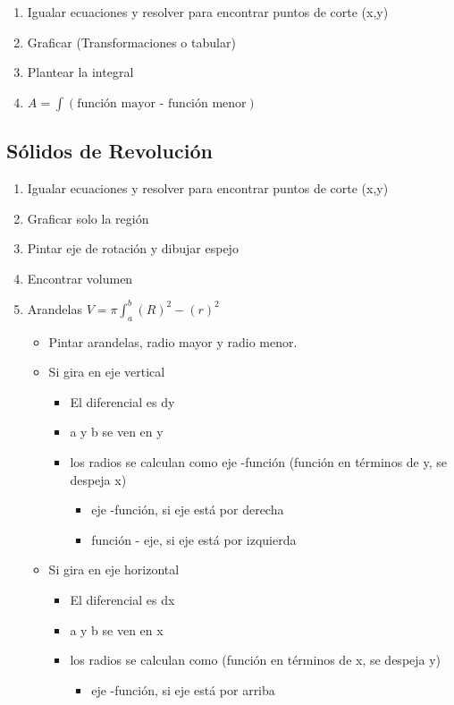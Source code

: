 \begin{enumerate}
	\item Igualar ecuaciones y resolver para encontrar puntos de corte (x,y)
	\item Graficar (Transformaciones o tabular)
	\item Plantear la integral
	\item $A=\int(\text{función mayor - función menor})$
\end{enumerate}

\subsection{Sólidos de Revolución}

\begin{enumerate}
	\item Igualar ecuaciones y resolver para encontrar puntos de corte (x,y)
	\item Graficar solo la región
	\item Pintar eje de rotación y dibujar espejo
	\item Encontrar volumen
	\item Arandelas $V=\pi\int_{a}^{b}(R)^2-(r)^2$
	\begin{itemize}
		\item Pintar arandelas, radio mayor y radio menor.
		\item Si gira en eje vertical
		\begin{itemize}
			\item El diferencial es dy
			\item a y b se ven en y
			\item los radios se calculan como eje -función (función en términos de y, se despeja x)
			\begin{itemize}
				\item eje -función, si eje está por derecha
				\item función - eje, si eje está por izquierda
			\end{itemize}
		\end{itemize}
		\item Si gira en eje horizontal
		\begin{itemize}
			\item El diferencial es dx
			\item a y b se ven en x
			\item los radios se calculan como (función en términos de x, se despeja y)
			\begin{itemize}
				\item eje -función, si eje está por arriba

\end{itemize}
\end{itemize}
\end{itemize}
\end{enumerate}

